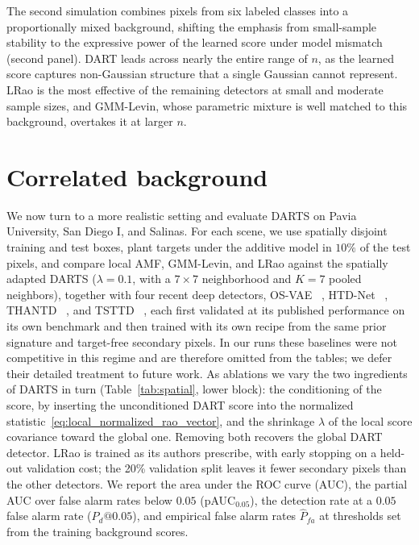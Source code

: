 The second simulation combines pixels from six labeled classes into a proportionally mixed background, shifting the emphasis from small-sample stability to the expressive power of the learned score under model mismatch (second panel). DART leads across nearly the entire range of $n$, as the learned score captures non-Gaussian structure that a single Gaussian cannot represent. LRao is the most effective of the remaining detectors at small and moderate sample sizes, and GMM-Levin, whose parametric mixture is well matched to this background, overtakes it at larger $n$.


\section{Correlated background}
\label{sec:spatial}

We now turn to a more realistic setting and evaluate DARTS on Pavia
University, San Diego I, and Salinas. For each scene, we use spatially disjoint training and test boxes, plant targets under the additive model in $10\%$ of the test pixels, and compare local AMF, GMM-Levin, and LRao against the spatially adapted DARTS ($\lambda=0.1$, with a $7\times 7$
neighborhood and $K=7$ pooled neighbors), together with four recent deep detectors, OS-VAE ~\cite{osvae}, HTD-Net ~\cite{htd-net}, THANTD ~\cite{thantd}, and TSTTD ~\cite{tsttd}, each first validated at its published performance on its own benchmark and then trained with its own recipe from the same prior signature and target-free
secondary pixels.
In our runs these baselines were not competitive in this regime and are
therefore omitted from the tables; we defer their detailed treatment to
future work.
As ablations we vary the two ingredients of DARTS in turn
(Table~\ref{tab:spatial}, lower block): the conditioning of the score, by
inserting the unconditioned DART score into the normalized
statistic~\eqref{eq:local_normalized_rao_vector}, and the shrinkage
$\lambda$ of the local score covariance toward the global one. Removing
both recovers the global DART detector.
LRao is trained as its authors prescribe, with early stopping on a held-out validation cost;
the 20\% validation split leaves it fewer secondary pixels than the other
detectors. We report the area under the ROC curve (AUC), the partial AUC
over false alarm rates below $0.05$ (pAUC$_{0.05}$), the detection rate at
a $0.05$ false alarm rate ($P_d@0.05$), and empirical false alarm rates
$\hat P_{fa}$ at thresholds set from the training background scores.

